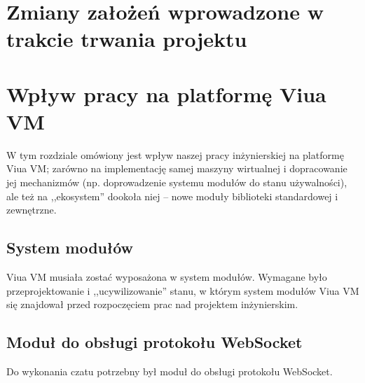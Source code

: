 \section{Zmiany założeń wprowadzone w trakcie trwania projektu}

\section{Wpływ pracy na platformę Viua VM}

W tym rozdziale omówiony jest wpływ naszej pracy inżynierskiej na platformę Viua VM; zarówno na implementację
samej maszyny wirtualnej i dopracowanie jej mechanizmów (np. doprowadzenie systemu modułów do stanu
używalności), ale też na ,,ekosystem'' dookoła niej -- nowe moduły biblioteki standardowej i zewnętrzne.

\subsection{System modułów}

Viua VM musiała zostać wyposażona w system modułów. Wymagane było przeprojektowanie i ,,ucywilizowanie''
stanu, w którym system modułów Viua VM się znajdował przed rozpoczęciem prac nad projektem inżynierskim.

\subsection{Moduł do obsługi protokołu WebSocket}

Do wykonania czatu potrzebny był moduł do obsługi protokołu WebSocket.
